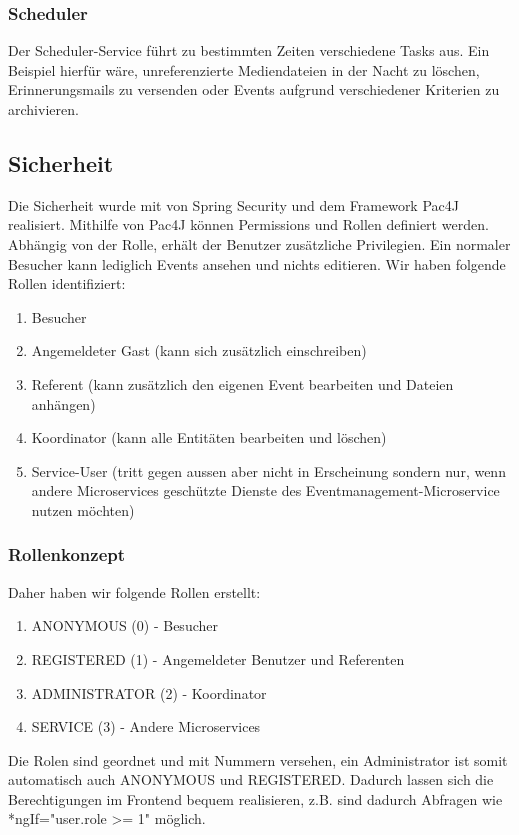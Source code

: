 \documentclass[11pt]{article} %
\begin{document}
\subsubsection{Scheduler}
Der Scheduler-Service führt zu bestimmten Zeiten verschiedene Tasks aus. Ein Beispiel hierfür wäre, unreferenzierte  Mediendateien in der Nacht zu löschen, Erinnerungsmails zu versenden oder Events aufgrund verschiedener Kriterien zu archivieren.

\newpage
\subsection{Sicherheit}
Die Sicherheit wurde mit von Spring Security und dem Framework Pac4J realisiert. Mithilfe von Pac4J können Permissions und Rollen definiert werden. Abhängig von der Rolle, erhält der Benutzer zusätzliche Privilegien. Ein normaler Besucher kann lediglich Events ansehen und nichts editieren. Wir haben folgende Rollen identifiziert:

\begin{enumerate}
\item Besucher
\item Angemeldeter Gast (kann sich zusätzlich einschreiben)
\item Referent (kann zusätzlich den eigenen Event bearbeiten und Dateien anhängen)
\item Koordinator (kann alle Entitäten bearbeiten und löschen)
\item Service-User (tritt gegen aussen aber nicht in Erscheinung sondern nur, wenn andere Microservices geschützte Dienste des Eventmanagement-Microservice nutzen möchten)
\end{enumerate}

\subsubsection{Rollenkonzept}

Daher haben wir folgende Rollen erstellt:

\begin{enumerate}
\item ANONYMOUS (0) - Besucher
\item REGISTERED (1) - Angemeldeter Benutzer und Referenten
\item ADMINISTRATOR (2) - Koordinator
\item SERVICE (3) - Andere Microservices
\end{enumerate}

Die Rolen sind geordnet und mit Nummern versehen, ein Administrator ist somit automatisch auch ANONYMOUS und REGISTERED. Dadurch lassen sich die Berechtigungen im Frontend bequem realisieren, z.B. sind dadurch Abfragen wie  *ngIf="user.role >= 1" möglich.
\end{document}
